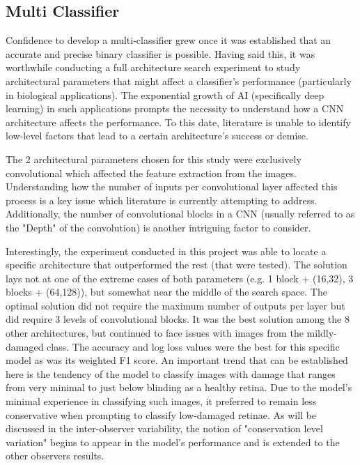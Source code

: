 \documentclass[a4paper]{article}
\begin{document}
    \subsection{Multi Classifier}
    Confidence to develop a multi-classifier grew once it was established that an accurate and precise binary classifier is possible. Having said this, it was worthwhile conducting a full architecture search experiment to study architectural parameters that might affect a classifier's performance (particularly in biological applications). The exponential growth of AI (specifically deep learning) in such applications prompts the necessity to understand how a CNN architecture affects the performance. To this date, literature is unable to identify low-level factors that lead to a certain architecture's success or demise. 
    \vspace{3mm}

    The 2 architectural parameters chosen for this study were exclusively convolutional which affected the feature extraction from the images. Understanding how the number of inputs per convolutional layer affected this process is a key issue which literature is currently attempting to address. Additionally, the number of convolutional blocks in a CNN (usually referred to as the "Depth" of the convolution) is another intriguing factor to consider. 
    \vspace{3mm}

    Interestingly, the experiment conducted in this project was able to locate a specific architecture that outperformed the rest (that were tested). The solution lays not at one of the extreme cases of both parameters (e.g. 1 block + (16,32), 3 blocks + (64,128)), but somewhat near the middle of the search space. The optimal solution did not require the maximum number of outputs per layer but did require 3 levels of convolutional blocks. It was the best solution among the 8 other architectures, but continued to face issues with images from the mildly-damaged class. The accuracy and log loss values were the best for this specific model as was its weighted F1 score. An important trend that can be established here is the tendency of the model to classify images with damage that ranges from very minimal to just below blinding as a healthy retina. Due to the model's minimal experience in classifying such images, it preferred to remain less conservative when prompting to classify low-damaged retinae. As will be discussed in the inter-observer variability, the notion of "conservation level variation" begins to appear in the model's performance and is extended to the other observers results. 
    \vspace{3mm}
\end{document}
